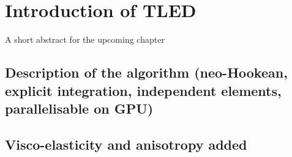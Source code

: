 \chapter{Introduction of TLED}
\label{chap5}
\begin{shortAbstract}
A short abstract for the upcoming chapter
\end{shortAbstract}


\section{Description of the algorithm (neo-Hookean, explicit integration, independent elements, parallelisable on GPU)}

\section{Visco-elasticity and anisotropy added }